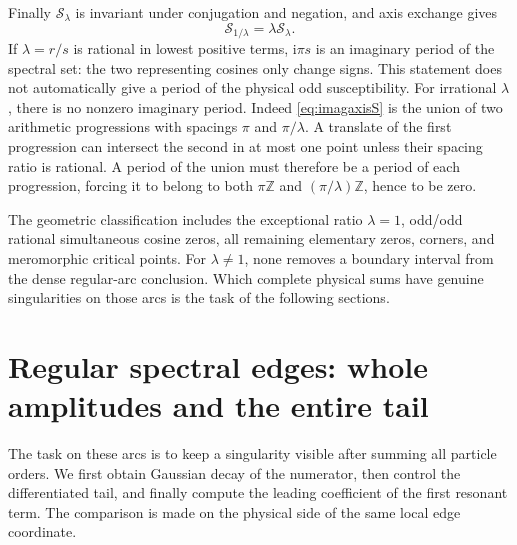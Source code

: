 \documentclass[11pt]{article}
\numberwithin{equation}{section}
\theoremstyle{definition}
\newcommand{\Z}{\mathbb Z}
\newcommand{\ii}{\mathrm i}
\newcommand{\cS}{\mathcal S}
\begin{document}
Finally \(\cS_\lambda\) is invariant under conjugation and negation,
and axis exchange gives
\[
 \cS_{1/\lambda}=\lambda\cS_\lambda.
\]
If \(\lambda=r/s\) is rational in lowest positive terms,
\(\ii\pi s\) is an imaginary period of the spectral set: the two
representing cosines only change signs. This statement does not
automatically give a period of the physical odd susceptibility.
For irrational \(\lambda\), there is no nonzero imaginary period.
Indeed \eqref{eq:imagaxisS} is the union of two arithmetic progressions
with spacings \(\pi\) and \(\pi/\lambda\). A translate of the first
progression can intersect the second in at most one point unless
their spacing ratio is rational. A period of the union must therefore
be a period of each progression, forcing it to belong to both
\(\pi\Z\) and \((\pi/\lambda)\Z\), hence to be zero.

The geometric classification includes the exceptional ratio \(\lambda=1\),
odd/odd rational simultaneous cosine zeros, all remaining elementary
zeros, corners, and meromorphic critical points.
For \(\lambda\ne1\), none removes a boundary interval from the dense
regular-arc conclusion. Which complete physical sums have genuine
singularities on those arcs is the task of the following sections.



\section{Regular spectral edges: whole amplitudes and the entire tail}
\label{sec:regular}

The task on these arcs is to keep a singularity visible after summing
all particle orders. We first obtain Gaussian decay of the numerator,
then control the differentiated tail, and finally compute the leading
coefficient of the first resonant term. The comparison is made on the
physical side of the same local edge coordinate.
\end{document}
